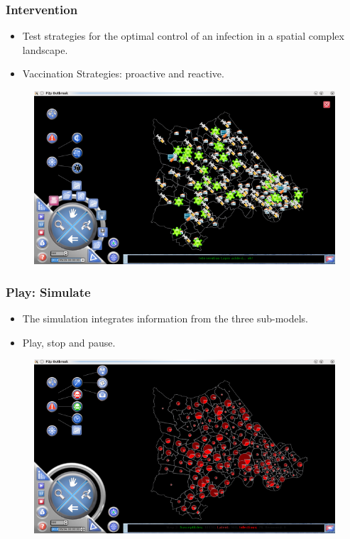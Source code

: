 \documentclass[hyperref={pdfpagelabels=true}]{beamer}
\begin{document}
\begin{frame}
\frametitle{Intervention}
\begin{itemize}
\item Test strategies for the optimal control of an infection in a spatial complex landscape.
\item Vaccination Strategies: proactive and reactive. %
\end{itemize}
\begin{figure}
\includegraphics[scale=0.4]{vaccin.png}
\end{figure}
\end{frame}

\begin{frame}
\frametitle{Play: Simulate}
\begin{itemize}
\item The simulation integrates information from the three sub-models.
\item Play, stop and pause.
\end{itemize}
\begin{figure}
\includegraphics[scale=0.45]{sim.png}
\end{figure}
\end{frame}
\end{document}
